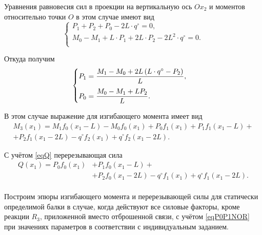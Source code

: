 \documentclass[12pt, a4paper]{article}
\begin{document}
	Уравнения равновесия сил в проекции на вертикальную ось $Ox_2$ и моментов относительно точки $O$ в этом случае имеют вид
	\vspace{-0.5em}
	\begin{equation*}
		\begin{cases}
			P_1 + P_2 + P_0 - 2L \cdot q^{\circ} = 0, \\
			M_0 - M_1 + L \cdot P_1 + 2L \cdot P_2 - 2 L^2 \cdot q^{\circ} = 0. \\
		\end{cases}
	\end{equation*}
	
	Откуда получим
	\begin{equation}
		\begin{cases} \vspace{0.75em}
			P_1 = \dfrac{ M_1 - M_0 + 2 L \left( L \cdot q^{\circ} - P_2 \right)}{L}, \\ 
			P_0 = \dfrac{M_0 - M_1 + L P_2}{L}. \\
		\end{cases}
		\label{eqP0P1NOR}
	\end{equation}
	
	В этом случае выражение для изгибающего момента имеет вид
	\begin{equation}
		\begin{split}
			M_3(x_1) = M_1 f_0(x_1 - L) - M_0 f_0(x_1) + P_0 f_1 (x_1) + P_1 f_1(x_1 - L) + \\ + P_2 f_1(x_1 - 2L) - q^{\circ} f_2(x_1) + q^{\circ} f_2(x_1 - 2L).
		\end{split}
		\label{eqM3NOR}
	\end{equation}
	
	С учётом \eqref{eqQ} перерезывающая сила
	\begin{equation}
		\begin{split}
		Q(x_1) = P_0 f_0 (x_1) & + P_1 f_0(x_1 - L) + \\ & + P_2 f_0(x_1 - 2L) - q^{\circ} f_1(x_1) + q^{\circ} f_1(x_1 - 2L).\\
	\end{split}
		\label{eqQNOR}
	\end{equation}
	
	Построим эпюры изгибающего момента и перерезывающей силы для статически определимой балки в случае, когда действуют все силовые факторы, кроме реакции $R_3$, приложенной вместо отброшенной связи, с учётом \eqref{eqP0P1NOR} при  значениях параметров в соответствии с индивидуальным заданием.
	
\end{document}
